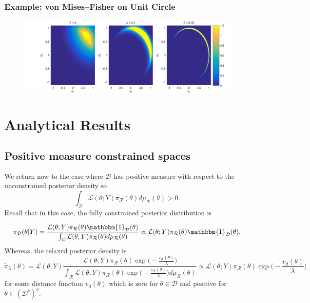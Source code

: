 \documentclass[10pt,fleqn]{article}
\DeclareMathOperator{\1}{\mathbbm{1}}
\begin{document}
{\subsubsection{Example: von Mises--Fisher on Unit Circle}

\begin{figure}
\begin{center}
\includegraphics[width=1\textwidth]{Bivariate_Normal_Unit_Circle_Constraint.jpg}
\caption{}
\label{FIG:Bivariate_Normal_Unit_Circle_Constraint}
\end{center}
\end{figure}

\section{Analytical Results}
\subsection{Positive measure constrained spaces}
\label{SEC:Positive_measure_theory}

We return now to the case where $\mathcal{D}$ has positive measure with respect to the unconstrained posterior density so $$\int_\mathcal{D} \mathcal{L}(\theta; Y) \pi_\mathcal{R}(\theta)d\mu_\mathcal{R}(\theta) >0.$$ Recall that in this case, the fully constrained posterior distribution is

$$\pi_\mathcal{D}(\theta|Y) = \frac{\mathcal{L}(\theta; Y) \pi_\mathcal{R}(\theta)\mathbbm{1}_\mathcal{D}(\theta)}{\int_\mathcal{D} \mathcal{L}(\theta; Y) \pi_\mathcal{R}(\theta)d\mu_\mathcal{R}(\theta)}\propto \mathcal{L}(\theta; Y) \pi_\mathcal{R}(\theta)\mathbbm{1}_\mathcal{D}(\theta). $$  Whereas, the relaxed posterior density is
$$\tilde{\pi}_\lambda(\theta) = \mathcal{L}(\theta; Y) \frac{\mathcal{L}(\theta; Y)\pi_\mathcal{R}(\theta)\exp\big(-\frac{v_d(\theta)}{\lambda}\big)}{\int_{\mathcal{R}}\mathcal{L}(\theta; Y) \pi_\mathcal{R}(\theta)\exp\big(-\frac{v_d(\theta)}{\lambda}\big) d\mu_\mathcal{R}(\theta)} \propto \mathcal{L}(\theta; Y) \pi_\mathcal{R}(\theta)\exp\big(-\frac{v_d(\theta)}{\lambda}\big)$$
for some distance function $v_d(\theta)$ which is zero for $\theta \in \mathcal{D}$ and positive for $\theta \in (\mathcal{D}^c)^o.$  

}
\end{document}
